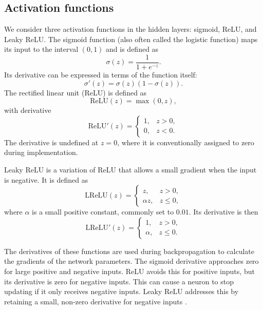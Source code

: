 \documentclass[amssymb,secnumarabic,twocolumn,aps]{revtex4}
\begin{document}
\subsection{Activation functions}

We consider three activation functions in the hidden layers: sigmoid, ReLU, and Leaky ReLU. The sigmoid function (also often called the logistic function) maps its input to the interval $(0,1)$ and is defined as
\begin{equation*}
    \sigma(z)=\frac{1}{1+e^{-z}}.
\end{equation*}
Its derivative can be expressed in terms of the function itself:
\begin{equation*}
    \sigma'(z)=\sigma(z)(1-\sigma(z)).
\end{equation*}
The rectified linear unit (ReLU) is defined as
\begin{equation*}
    \text{ReLU}(z)=\max(0,z),
\end{equation*}
with derivative
\begin{equation*}
    \text{ReLU}'(z)=
    \begin{cases}
        1, & z>0, \\
        0, & z<0.
    \end{cases}
\end{equation*}
The derivative is undefined at $z=0$, where it is conventionally assigned to zero during implementation.

Leaky ReLU is a variation of ReLU that allows a small gradient when the input is negative. It is defined as
\begin{equation*}
    \text{LReLU}(z)=
    \begin{cases}
        z,        & z>0,     \\
        \alpha z, & z\leq 0,
    \end{cases}
\end{equation*}
where $\alpha$ is a small positive constant, commonly set to $0.01$. Its derivative is then
\begin{equation*}
    \text{LReLU}'(z)=
    \begin{cases}
        1,      & z>0,     \\
        \alpha, & z\leq 0.
    \end{cases}
\end{equation*}

The derivatives of these functions are used during backpropagation to calculate the gradients of the network parameters. The sigmoid derivative approaches zero for large positive and negative inputs. ReLU avoids this for positive inputs, but its derivative is zero for negative inputs. This can cause a neuron to stop updating if it only receives negative inputs. Leaky ReLU addresses this by retaining a small, non-zero derivative for negative inputs \cite{lecturebook}.
\end{document}
